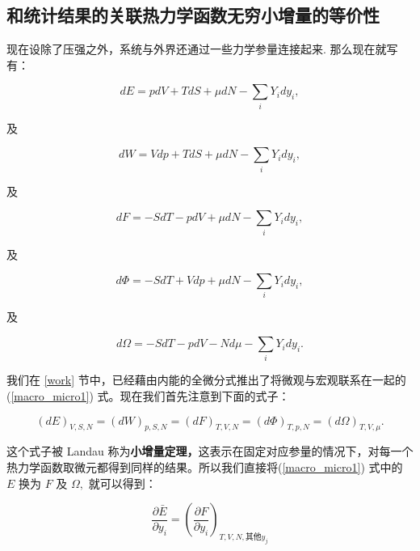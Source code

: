 \subsection{和统计结果的关联\quad 热力学函数无穷小增量的等价性}
现在设除了压强之外，系统与外界还通过一些力学参量连接起来. 那么现在就写有：
\begin{linenomath}\begin{equation}
dE= pdV + TdS + \mu dN -\sum_{i} Y_idy_i,
\end{equation}\end{linenomath}
及\begin{linenomath}\begin{equation}
dW = Vdp+TdS+\mu dN-\sum_{i} Y_idy_i,
\end{equation}\end{linenomath}及
\begin{linenomath}\begin{equation}
dF = -SdT-pdV+\mu dN-\sum_{i} Y_idy_i,
\end{equation}\end{linenomath}及
\begin{linenomath}\begin{equation}
d\Phi = -SdT + Vdp + \mu dN-\sum_{i} Y_idy_i,
\end{equation}\end{linenomath}及
\begin{linenomath}\begin{equation}
d\Omega = -SdT - pdV - Nd \mu-\sum_{i} Y_idy_i.
\end{equation}\end{linenomath}
我们在 \ref{work} 节中，已经藉由内能的全微分式推出了将微观与宏观联系在一起的 (\ref{macro_micro1}) 式。现在我们首先注意到下面的式子：
\begin{linenomath}\begin{equation}
\left( dE \right)_{V,S,N}=\left( dW \right)_{p,S,N} = \left( dF \right)_{T,V,N} = \left(d\Phi\right)_{T,p,N} = \left(d\Omega\right)_{T,V,\mu}.
\end{equation}\end{linenomath}
这个式子被 Landau 称为\textbf{小增量定理，}这表示在固定对应参量的情况下，对每一个热力学函数取微元都得到同样的结果。所以我们直接将(\ref{macro_micro1}) 式中的 $E$ 换为 $F$ 及 $\Omega,$ 就可以得到：
\begin{linenomath}\begin{equation}
\frac{\partial \bar E}{\partial y_i} = \left( \frac{\partial  F}{\partial y_i} \right)_{T,V,N,\text{其他}y_j}\label{macro_micro2}
\end{equation}\end{linenomath}
